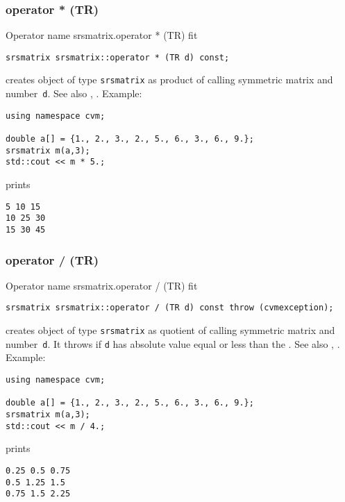 \subsubsection{operator * (TR)}
Operator%
\pdfdest name {srsmatrix.operator * (TR)} fit
\begin{verbatim}
srsmatrix srsmatrix::operator * (TR d) const;
\end{verbatim}
creates  object of type \verb"srsmatrix" as  product of
 calling symmetric matrix and  number~\verb"d".
See also ,
.
Example:
\begin{Verbatim}
using namespace cvm;

double a[] = {1., 2., 3., 2., 5., 6., 3., 6., 9.};
srsmatrix m(a,3);
std::cout << m * 5.;
\end{Verbatim}
prints
\begin{Verbatim}
5 10 15
10 25 30
15 30 45
\end{Verbatim}
\newpage



\subsubsection{operator / (TR)}
Operator%
\pdfdest name {srsmatrix.operator / (TR)} fit
\begin{verbatim}
srsmatrix srsmatrix::operator / (TR d) const throw (cvmexception);
\end{verbatim}
creates  object of type \verb"srsmatrix" as  quotient of
 calling symmetric matrix and  number~\verb"d". It throws
if \verb"d" has  absolute value equal or less than the
.
See also ,
.
Example:
\begin{Verbatim}
using namespace cvm;

double a[] = {1., 2., 3., 2., 5., 6., 3., 6., 9.};
srsmatrix m(a,3);
std::cout << m / 4.;
\end{Verbatim}
prints
\begin{Verbatim}
0.25 0.5 0.75
0.5 1.25 1.5
0.75 1.5 2.25
\end{Verbatim}
\newpage



